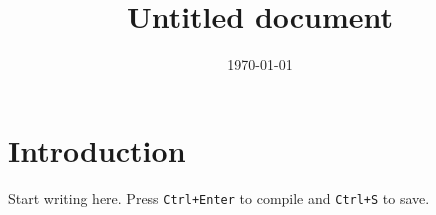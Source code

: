 \documentclass[a4paper,11pt]{article}
\title{Untitled document}
\author{}
\date{\today}
\begin{document}
\maketitle

\section{Introduction}

Start writing here. Press \texttt{Ctrl+Enter} to compile and \texttt{Ctrl+S} to save.
\end{document}
